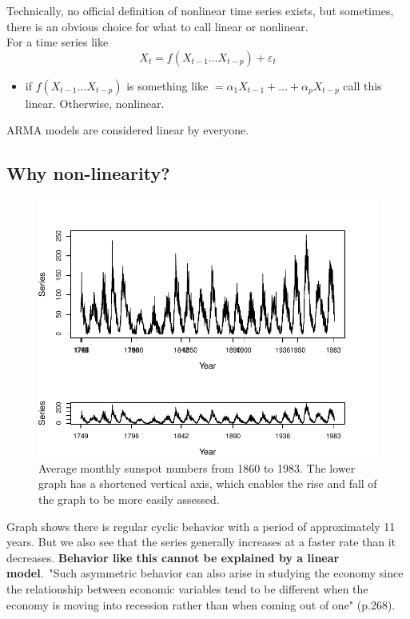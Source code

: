 Technically, no official definition of nonlinear time series exists, but sometimes, there is an obvious choice for what to call linear or nonlinear. \\

For a time series like \[X_t = f(X_{t-1} ... X_{t-p}) + \varepsilon_t \]
\begin{itemize}
    \item if $f(X_{t-1} ... X_{t-p})$ is something like $ =\alpha_1 X_{t-1} + ...+ \alpha_p X_{t-p}$ call this linear. Otherwise, nonlinear.
\end{itemize}
ARMA models are considered linear by everyone. 

\subsection{Why non-linearity?}

\begin{figure}[H]
\centering
\includegraphics[scale=0.8]{plots/sunpots.pdf}
\caption{Average monthly sunspot numbers from 1860 to 1983. The lower graph has a shortened vertical axis, which enables the rise and fall of the graph to be more easily assessed.}
\end{figure}

Graph shows there is regular cyclic behavior with a period of approximately 11 years. But we also see that the series generally increases at a faster rate than it decreases. \textbf{Behavior like this cannot be explained by a linear model}.\
"Such asymmetric behavior can also arise in studying the economy since the relationship between economic variables tend to be different when the economy is moving into recession rather than when coming out of one" (p.268). \\

